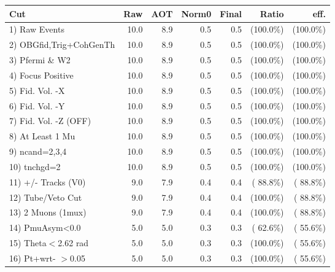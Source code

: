  \begin{table}[h!]\centering
 \begin{tabular}{||l||r|r|r|r|r|r||}
 \hline
 \hline
 Cut & Raw & AOT & Norm0 & Final & Ratio & eff.       \\
 \hline
  1) Raw Events           &         10.0 &          8.9 &          0.5 &          0.5 & (100.0\%) & (100.0\%) \\
  2) OBGfid,Trig+CohGenTh &         10.0 &          8.9 &          0.5 &          0.5 & (100.0\%) & (100.0\%) \\
  3) Pfermi \& W2         &         10.0 &          8.9 &          0.5 &          0.5 & (100.0\%) & (100.0\%) \\
  4) Focus Positive       &         10.0 &          8.9 &          0.5 &          0.5 & (100.0\%) & (100.0\%) \\
  5) Fid. Vol. -X         &         10.0 &          8.9 &          0.5 &          0.5 & (100.0\%) & (100.0\%) \\
  6) Fid. Vol. -Y         &         10.0 &          8.9 &          0.5 &          0.5 & (100.0\%) & (100.0\%) \\
  7) Fid. Vol. -Z (OFF)   &         10.0 &          8.9 &          0.5 &          0.5 & (100.0\%) & (100.0\%) \\
  8) At Least 1 Mu        &         10.0 &          8.9 &          0.5 &          0.5 & (100.0\%) & (100.0\%) \\
  9) ncand=2,3,4          &         10.0 &          8.9 &          0.5 &          0.5 & (100.0\%) & (100.0\%) \\
 10) tnchgd=2             &         10.0 &          8.9 &          0.5 &          0.5 & (100.0\%) & (100.0\%) \\
 11) +/- Tracks (V0)      &          9.0 &          7.9 &          0.4 &          0.4 & ( 88.8\%) & ( 88.8\%) \\
 12) Tube/Veto Cut        &          9.0 &          7.9 &          0.4 &          0.4 & (100.0\%) & ( 88.8\%) \\
 13) 2 Muons (1mux)       &          9.0 &          7.9 &          0.4 &          0.4 & (100.0\%) & ( 88.8\%) \\
 14) PmuAsym<0.0          &          5.0 &          5.0 &          0.3 &          0.3 & ( 62.6\%) & ( 55.6\%) \\
 15) Theta$<$2.62 rad     &          5.0 &          5.0 &          0.3 &          0.3 & (100.0\%) & ( 55.6\%) \\
 16) Pt+wrt- $>$0.05      &          5.0 &          5.0 &          0.3 &          0.3 & (100.0\%) & ( 55.6\%) \\

\end{tabular}
\end{table}
